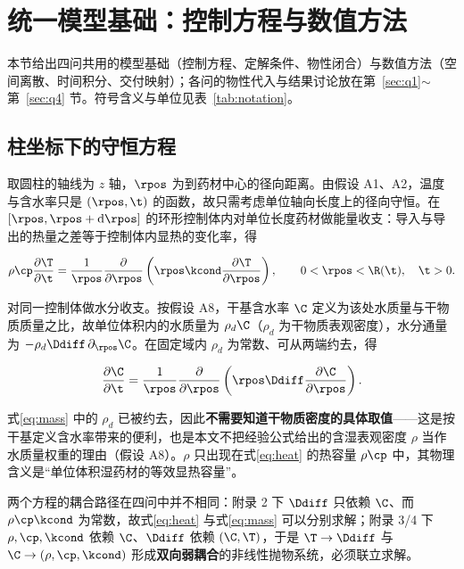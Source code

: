 \section{统一模型基础：控制方程与数值方法}
\label{sec:modelbase}

本节给出四问共用的模型基础（控制方程、定解条件、物性闭合）与数值方法（空间离散、时间积分、交付映射）；各问的物性代入与结果讨论放在第~\ref{sec:q1}$\sim$第~\ref{sec:q4} 节。符号含义与单位见表~\ref{tab:notation}。


\subsection{柱坐标下的守恒方程}
\label{sec:governing}

取圆柱的轴线为 $z$ 轴，$\rpos$ 为到药材中心的径向距离。由假设 A1、A2，温度与含水率只是 $(\rpos,\t)$ 的函数，故只需考虑单位轴向长度上的径向守恒。在 $[\rpos,\rpos+\mathrm{d}\rpos]$ 的环形控制体内对单位长度药材做能量收支：导入与导出的热量之差等于控制体内显热的变化率，得\cite{crank1975,incropera2011}

\begin{equation}
\rho\cp\frac{\partial \T}{\partial \t}
=\frac{1}{\rpos}\frac{\partial}{\partial \rpos}\left(\rpos\kcond\frac{\partial \T}{\partial \rpos}\right),
\qquad 0<\rpos<\R(\t),\quad \t>0 .
\label{eq:heat}
\end{equation}

对同一控制体做水分收支。按假设 A8，干基含水率 $\C$ 定义为该处水质量与干物质质量之比，故单位体积内的水质量为 $\rho_d\C$（$\rho_d$ 为干物质表观密度），水分通量为 $-\rho_d\Ddiff\,\partial_\rpos\C$。在固定域内 $\rho_d$ 为常数、可从两端约去，得

\begin{equation}
\frac{\partial \C}{\partial \t}
=\frac{1}{\rpos}\frac{\partial}{\partial \rpos}\left(\rpos\Ddiff\frac{\partial \C}{\partial \rpos}\right).
\label{eq:mass}
\end{equation}

式\eqref{eq:mass} 中的 $\rho_d$ 已被约去，因此\textbf{不需要知道干物质密度的具体取值}——这是按干基定义含水率带来的便利，也是本文不把经验公式给出的含湿表观密度 $\rho$ 当作水质量权重的理由（假设 A8）。$\rho$ 只出现在式\eqref{eq:heat} 的热容量 $\rho\cp$ 中，其物理含义是``单位体积湿药材的等效显热容量''。

两个方程的耦合路径在四问中并不相同：附录 2 下 $\Ddiff$ 只依赖 $\C$、而 $\rho\cp\kcond$ 为常数，故式\eqref{eq:heat} 与式\eqref{eq:mass} 可以分别求解；附录 3/4 下 $\rho,\cp,\kcond$ 依赖 $\C$、$\Ddiff$ 依赖 $(\C,\T)$，于是 $\T\to\Ddiff$ 与 $\C\to(\rho,\cp,\kcond)$ 形成\textbf{双向弱耦合}的非线性抛物系统，必须联立求解。

